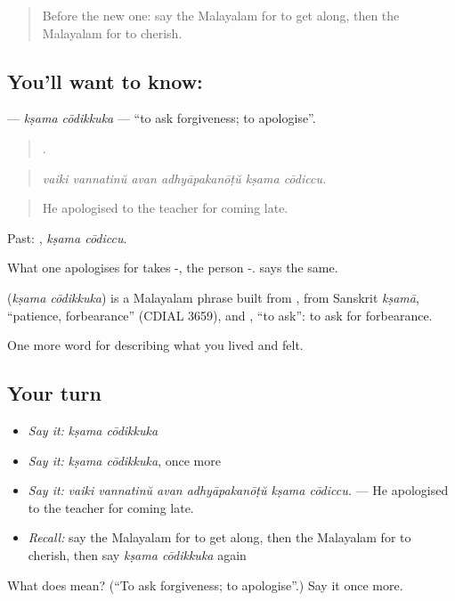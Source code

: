\label{lesson:ML-C559-ksama-codikkuka}



\begin{quote}
Before the new one: say the Malayalam for to get along, then the Malayalam for to cherish.
\end{quote}

\subsection*{You'll want to know:  }
\textbf{ } — \emph{kṣama cōdikkuka} — \textquotedblleft{}to ask forgiveness; to apologise\textquotedblright{}.

\begin{quote}
     .
\end{quote}

\begin{quote}
\emph{vaiki vannatinŭ avan adhyāpakanōṭŭ kṣama cōdiccu.}
\end{quote}

\begin{quote}
He apologised to the teacher for coming late.
\end{quote}

Past:  , \emph{kṣama cōdiccu}.

What one apologises for takes -, the person -.   says the same.

\begin{cousinweb}
\textbf{ } (\emph{kṣama cōdikkuka}) is a Malayalam phrase built from , from Sanskrit \emph{kṣamā}, \textquotedblleft{}patience, forbearance\textquotedblright{} (CDIAL 3659), and , \textquotedblleft{}to ask\textquotedblright{}: to ask for forbearance.
\end{cousinweb}

\begin{grammarlens}[title={What you've built}]
One more word for describing what you lived and felt.
\end{grammarlens}

\subsection*{Your turn}
\begin{itemize}
\raggedright
  \item \emph{Say it:} \emph{kṣama cōdikkuka}
  \item \emph{Say it:} \emph{kṣama cōdikkuka}, once more
  \item \emph{Say it:} \emph{vaiki vannatinŭ avan adhyāpakanōṭŭ kṣama cōdiccu.} — He apologised to the teacher for coming late.
  \item \emph{Recall:} say the Malayalam for to get along, then the Malayalam for to cherish, then say \emph{kṣama cōdikkuka} again
\end{itemize}

\begin{tcolorbox}[breakable,colback=teal!4,colframe=teal!35!black,title={Before you move on}]
What does   mean? (\textquotedblleft{}To ask forgiveness; to apologise\textquotedblright{}.) Say it once more.
\end{tcolorbox}
